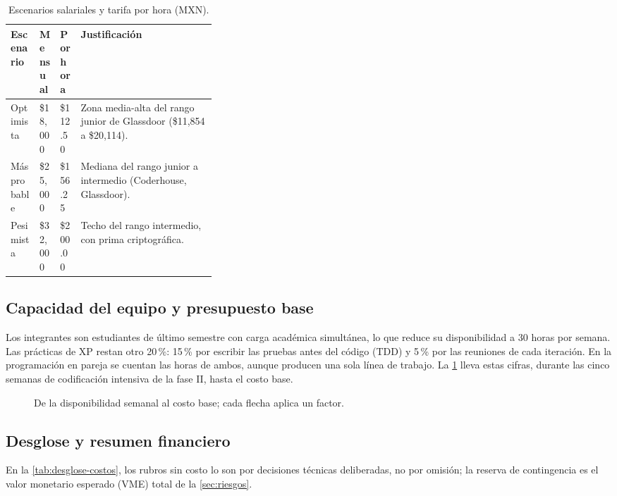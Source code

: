 \begin{table}[htbp]
  \centering
  
  \caption{Escenarios salariales y tarifa por hora (MXN).}
  \label{tab:escenarios-salariales}
  \begin{tabularx}{\linewidth}{@{}L{0.14\linewidth}R{0.10\linewidth}R{0.10\linewidth}X@{}}
    \toprule
    \textbf{Escenario} & \textbf{Mensual} & \textbf{Por hora} & \textbf{Justificación} \\
    \midrule
    Optimista & \$18,000 & \$112.50 & Zona media-alta del rango junior de Glassdoor (\$11,854 a \$20,114). \\
    Más probable & \$25,000 & \$156.25 & Mediana del rango junior a intermedio (Coderhouse, Glassdoor). \\
    Pesimista & \$32,000 & \$200.00 & Techo del rango intermedio, con prima criptográfica. \\
    \bottomrule
  \end{tabularx}
\end{table}

\subsection{Capacidad del equipo y presupuesto base}\label{sec:costos-capacidad}

Los integrantes son estudiantes de último semestre con carga académica simultánea, lo que reduce su disponibilidad a 30 horas por semana. Las prácticas de XP restan otro 20\,\%: 15\,\% por escribir las pruebas antes del código (TDD) y 5\,\% por las reuniones de cada iteración. En la programación en pareja se cuentan las horas de ambos, aunque producen una sola línea de trabajo. La \cref{fig:costos-capacidad} lleva estas cifras, durante las cinco semanas de codificación intensiva de la fase II, hasta el costo base.

\begin{figure}[htbp]
  \centering
  
  \caption{De la disponibilidad semanal al costo base; cada flecha aplica un factor.}
  \label{fig:costos-capacidad}
\end{figure}

\subsection{Desglose y resumen financiero}\label{sec:costos-desglose}

En la \cref{tab:desglose-costos}, los rubros sin costo lo son por decisiones técnicas deliberadas, no por omisión; la reserva de contingencia es el valor monetario esperado (VME) total de la \cref{sec:riesgos}.


